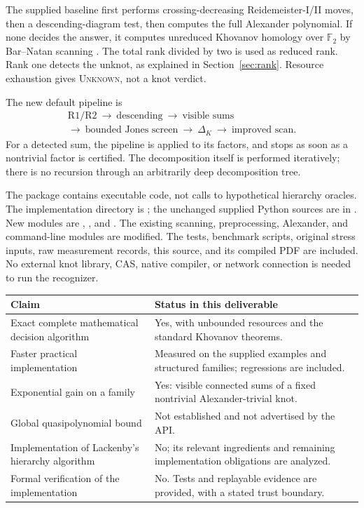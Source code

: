 \documentclass[11pt,a4paper]{article}
\theoremstyle{definition}\newtheorem{remark}[theorem]{Remark}
\newcommand{\F}{\mathbb F_2}
\newcommand{\Unknown}{\textsc{Unknown}}
\begin{document}
The supplied baseline first performs crossing-decreasing Reidemeister-I/II moves,
then a descending-diagram test, then computes the full Alexander polynomial. If
none decides the answer, it computes unreduced Khovanov homology over $\F$ by
Bar--Natan scanning \cite{BNfast,BNtangles}. The total rank divided by two is
used as reduced rank. Rank one detects the unknot, as explained in
Section~\ref{sec:rank}. Resource exhaustion gives \Unknown, not a knot verdict.

The new default pipeline is
\[
\begin{gathered}
\text{R1/R2}\ \longrightarrow\ \text{descending}\ \longrightarrow\ \text{visible sums}\\[3pt]
\longrightarrow\ \text{bounded Jones screen}\ \longrightarrow\ \Delta_K\ \longrightarrow\ \text{improved scan}.
\end{gathered}
\]
For a detected sum, the pipeline is applied to its factors, and stops as soon as a
nontrivial factor is certified. The decomposition itself is performed iteratively;
there is no recursion through an arbitrarily deep decomposition tree.

The package contains executable code, not calls to hypothetical hierarchy oracles.
The implementation directory is ; the unchanged supplied
Python sources are in . New modules are
, , and . The existing scanning,
preprocessing, Alexander, and command-line modules are modified. The tests,
benchmark scripts, original stress inputs, raw measurement records, this source,
and its compiled PDF are included. No external knot library, CAS, native compiler,
or network connection is needed to run the recognizer.

\begin{center}
\small
\begin{tabularx}{\linewidth}{@{}p{.34\linewidth}X@{}}
\toprule
Claim & Status in this deliverable\\
\midrule
Exact complete mathematical decision algorithm & Yes, with unbounded resources and the standard Khovanov theorems.\\
Faster practical implementation & Measured on the supplied examples and structured families; regressions are included.\\
Exponential gain on a family & Yes: visible connected sums of a fixed nontrivial Alexander-trivial knot.\\
Global quasipolynomial bound & Not established and not advertised by the API.\\
Implementation of Lackenby's hierarchy algorithm & No; its relevant ingredients and remaining implementation obligations are analyzed.\\
Formal verification of the implementation & No. Tests and replayable evidence are provided, with a stated trust boundary.\\
\bottomrule
\end{tabularx}
\end{center}
\end{document}
